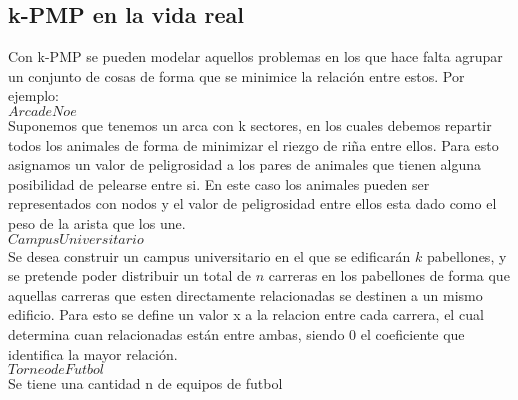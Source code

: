 \subsection{k-PMP en la vida real}

Con k-PMP se pueden modelar aquellos problemas en los que hace falta agrupar un conjunto de cosas de forma que se minimice la relación entre estos.
Por ejemplo:\\

$Arca de Noe$\\
Suponemos que tenemos un arca con k sectores, en los cuales debemos repartir todos los animales de forma de minimizar el riezgo de riña entre ellos. Para esto asignamos un valor de peligrosidad a los pares de animales que tienen alguna posibilidad de pelearse entre si. En este caso los animales pueden ser representados con nodos y el valor de peligrosidad entre ellos esta dado como el peso de la arista que los une.\\


$Campus Universitario$\\
Se desea construir un campus universitario en el que se edificarán $k$ pabellones, y se pretende poder distribuir un total de $n$ carreras en los pabellones de forma que aquellas carreras que esten directamente relacionadas se destinen a un mismo edificio. Para esto se define un valor x a la relacion entre cada carrera, el cual determina cuan relacionadas están entre ambas, siendo 0 el coeficiente que identifica la mayor relación.\\


$Torneo de Futbol$\\
Se tiene una cantidad n de equipos de futbol